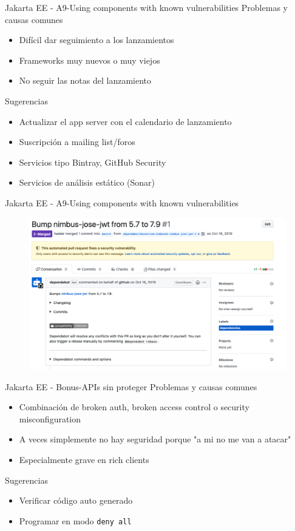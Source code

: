 \documentclass[aspectratio=169]{beamer}
\begin{document}
\begin{frame}{Jakarta EE - A9-Using components with known vulnerabilities}
    Problemas y causas comunes
    \begin{itemize}
        \item Difícil dar seguimiento a los lanzamientos
        \item Frameworks muy nuevos o muy viejos
        \item No seguir las notas del lanzamiento
    \end{itemize}

    Sugerencias
    \begin{itemize}
        \item Actualizar el app server con el calendario de lanzamiento
        \item Suscripción a mailing list/foros
        \item Servicios tipo Bintray, GitHub Security
        \item Servicios de análisis estático (Sonar)
    \end{itemize}
\end{frame}

\begin{frame}{Jakarta EE - A9-Using components with known vulnerabilities}
    \begin{figure}
        \centering
        \includegraphics[width=0.9\linewidth]{Images/github}
    \end{figure}
\end{frame}

\begin{frame}{Jakarta EE - Bonus-APIs sin proteger}
    Problemas y causas comunes
    \begin{itemize}
        \item Combinación de broken auth, broken access control o security misconfiguration
        \item A veces simplemente no hay seguridad porque "a mi no me van a atacar"
        \item Especialmente grave en rich clients
    \end{itemize}

    Sugerencias
    \begin{itemize}
        \item Verificar código auto generado
        \item Programar en modo \texttt{deny all}
    \end{itemize}
\end{frame}
\end{document}
